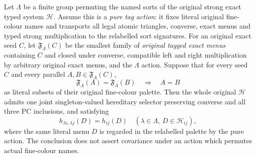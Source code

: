 \begin{lemma}
\label{lem:typed-pure-action-gate-engine}
Let $\Lambda$ be a finite group permuting the named sorts of the
original strong exact typed system $\mathcal H$.  Assume this is a
\emph{pure tag action}: it fixes literal original fine-colour names
and transports all legal atomic triangles, converse, exact menus
and typed strong multiplication to the relabelled sort signatures.
For an original exact seed $C$, let $\mathfrak F_\Lambda(C)$
be the smallest family of \emph{original tagged exact menus}
containing $C$ and closed under converse, compatible left and
right multiplication by arbitrary original exact menus, and the
$\Lambda$ action.  Suppose that for every seed $C$ and every
parallel $A,B\in\mathfrak F_\Lambda(C)$,
\[
 \mathfrak F_\Lambda(A)=\mathfrak F_\Lambda(B)
      \quad\Longrightarrow\quad A=B
\]
as literal subsets of their original fine-colour palette.
Then the whole original $\mathcal H$ admits one joint
singleton-valued hereditary selector preserving converse and
all three PC inclusions, and satisfying
\[
 h_{\lambda i,\lambda j}(D)=h_{ij}(D)
 \quad(\lambda\in\Lambda,\ D\in\mathcal H_{ij}),
\]
where the same literal menu $D$ is regarded in the relabelled
palette by the pure action.  The conclusion does not assert
covariance under an action which permutes actual fine-colour names.
\end{lemma}
